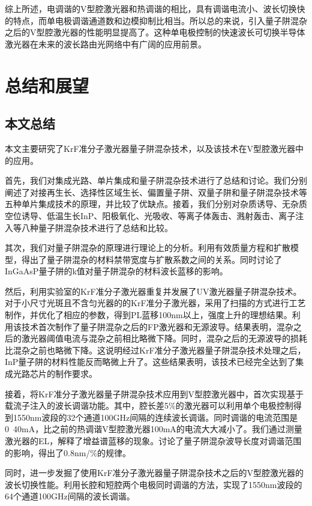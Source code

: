 \documentclass{ZJUthesis}
\begin{document}
综上所述，电调谐的V型腔激光器和热调谐的相比，具有调谐电流小、波长切换快的特点，而单电极调谐通道数和边模抑制比相当。所以总的来说，引入量子阱混杂之后的V型腔激光器的性能明显提高了。这种单电极控制的快速波长可切换半导体激光器在未来的波长路由光网络中有广阔的应用前景。

\chapter{总结和展望}

\section{本文总结}

本文主要研究了KrF准分子激光器量子阱混杂技术，以及该技术在V型腔激光器中的应用。

首先，我们对集成光路、单片集成和量子阱混杂技术进行了总结和讨论。我们分别阐述了对接再生长、选择性区域生长、偏置量子阱、双量子阱和量子阱混杂技术等五种单片集成技术的原理，并比较了优缺点。接着，我们分别对杂质诱导、无杂质空位诱导、低温生长InP、阳极氧化、光吸收、等离子体轰击、溅射轰击、离子注入等八种量子阱混杂技术进行了总结和比较。

其次，我们对量子阱混杂的原理进行理论上的分析。利用有效质量方程和扩散模型，得出了量子阱混杂的材料禁带宽度与扩散系数之间的关系。同时讨论了InGaAsP量子阱的k值对量子阱混杂的材料波长蓝移的影响。

然后，利用实验室的KrF准分子激光器重复并发展了UV激光器量子阱混杂技术。对于小尺寸光斑且不含匀光器的的KrF准分子激光器，采用了扫描的方式进行工艺制作，并优化了相应的参数，得到PL蓝移100nm以上，强度上升的理想结果。利用该技术首次制作了量子阱混杂之后的FP激光器和无源波导。结果表明，混杂之后的激光器阈值电流与混杂之前相比略微下降。同时，混杂之后的无源波导的损耗比混杂之前也略微下降。这说明经过KrF准分子激光器量子阱混杂技术处理之后，InP量子阱的材料性能反而略微上升了。这些结果表明，该技术已经完全达到了集成光路芯片的制作要求。

接着，将KrF准分子激光器量子阱混杂技术应用到V型腔激光器中，首次实现基于载流子注入的波长调谐功能。其中，腔长差5\%的激光器可以利用单个电极控制得到1550nm波段的32个通道100GHz间隔的连续波长调谐。同时调谐的电流范围是0~40mA，比之前的热调谐V型腔激光器100mA的电流大大减小了。我们通过测量激光器的EL，解释了增益谱蓝移的现象。讨论了量子阱混杂波导长度对调谐范围的影响，得出了0.8nm/\%的规律。

同时，进一步发掘了使用KrF准分子激光器量子阱混杂技术之后的V型腔激光器的波长切换性能。利用长腔和短腔两个电极同时调谐的方法，实现了1550nm波段的64个通道100GHz间隔的波长调谐。
\end{document}
